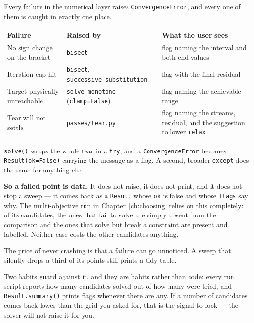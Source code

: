 \documentclass[11pt,a4paper]{report}
\newcommand{\code}[1]{\texttt{\small #1}}
\begin{document}
Every failure in the numerical layer raises \code{ConvergenceError}, and
every one of them is caught in exactly one place.

\begin{center}
\small
\begin{tabular}{@{}p{4.3cm}p{4.0cm}p{4.6cm}@{}}
\toprule
Failure & Raised by & What the user sees \\
\midrule
No sign change on the bracket & \code{bisect} &
flag naming the interval and both end values \\[2pt]
Iteration cap hit & \code{bisect}, \code{successive\_substitution} &
flag with the final residual \\[2pt]
Target physically unreachable & \code{solve\_monotone} (\code{clamp=False}) &
flag naming the achievable range \\[2pt]
Tear will not settle & \code{passes/tear.py} &
flag naming the streams, residual, and the suggestion to lower
\code{relax} \\
\bottomrule
\end{tabular}
\end{center}

\code{solve()} wraps the whole tear in a \code{try}, and a
\code{ConvergenceError} becomes \code{Result(ok=False)} carrying the
message as a flag. A second, broader \code{except} does the same for
anything else.

\textbf{So a failed point is data.} It does not raise, it does not print,
and it does not stop a sweep --- it comes back as a \code{Result} whose
\code{ok} is false and whose \code{flags} say why. The multi-objective run
in Chapter~\ref{ch:choosing} relies on this completely: of its candidates,
the ones that fail to solve are simply absent from the comparison and the
ones that solve but break a constraint are present and labelled. Neither
case costs the other candidates anything.

\begin{caveat}[title={Caveat: silence is the risk this creates}]
The price of never crashing is that a failure can go unnoticed. A sweep
that silently drops a third of its points still prints a tidy table.

Two habits guard against it, and they are habits rather than code: every
run script reports how many candidates solved out of how many were tried,
and \code{Result.summary()} prints flags whenever there are any. If a
number of candidates comes back lower than the grid you asked for, that is
the signal to look --- the solver will not raise it for you.
\end{caveat}
\end{document}
